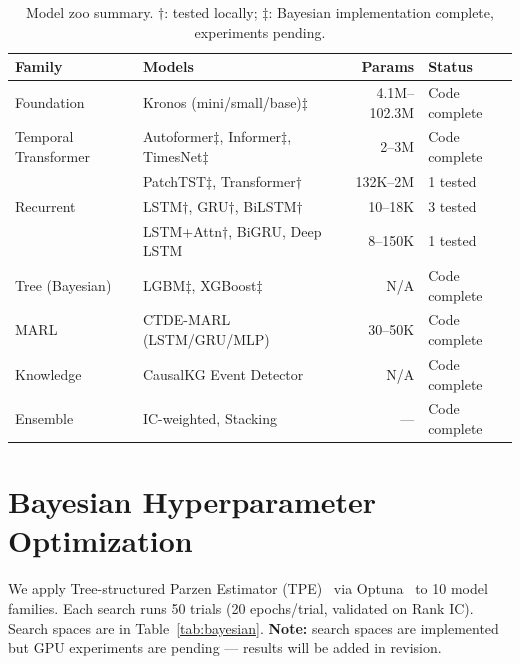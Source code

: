 \documentclass[sigconf,10pt]{acmart}
\begin{document}
\begin{table}[htbp]
\centering
\caption{Model zoo summary. $\dagger$: tested locally; $\ddagger$: Bayesian implementation complete, experiments pending.}
\label{tab:models}
\small
\begin{tabular}{@{}llrl@{}}
\toprule
\textbf{Family} & \textbf{Models} & \textbf{Params} & \textbf{Status} \\
\midrule
Foundation & Kronos (mini/small/base)$\ddagger$ & 4.1M--102.3M & Code complete \\
Temporal Transformer & Autoformer$\ddagger$, Informer$\ddagger$, TimesNet$\ddagger$ & 2--3M & Code complete \\
 & PatchTST$\ddagger$, Transformer$\dagger$ & 132K--2M & 1 tested \\
Recurrent & LSTM$\dagger$, GRU$\dagger$, BiLSTM$\dagger$ & 10--18K & 3 tested \\
 & LSTM+Attn$\dagger$, BiGRU, Deep LSTM & 8--150K & 1 tested \\
Tree (Bayesian) & LGBM$\ddagger$, XGBoost$\ddagger$ & N/A & Code complete \\
MARL & CTDE-MARL (LSTM/GRU/MLP) & 30--50K & Code complete \\
Knowledge & CausalKG Event Detector & N/A & Code complete \\
Ensemble & IC-weighted, Stacking & --- & Code complete \\
\bottomrule
\end{tabular}
\end{table}

\section{Bayesian Hyperparameter Optimization}

We apply Tree-structured Parzen Estimator (TPE)~\cite{bergstra2011algorithms} via Optuna~\cite{akiba2019optuna} to 10 model families. Each search runs 50 trials (20 epochs/trial, validated on Rank IC). Search spaces are in Table~\ref{tab:bayesian}. \textbf{Note:} search spaces are implemented but GPU experiments are pending — results will be added in revision.
\end{document}
